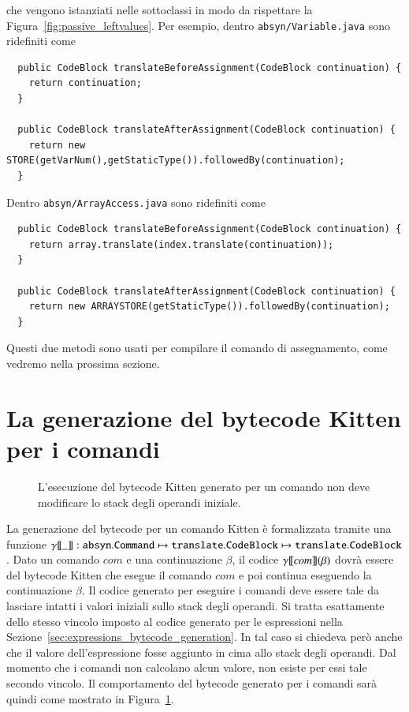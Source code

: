 %
\noindent
che vengono istanziati nelle sottoclassi in modo da rispettare la
Figura~\ref{fig:passive_leftvalues}. Per esempio, dentro
\texttt{absyn/Variable.java} sono ridefiniti come
%
\begin{verbatim}
  public CodeBlock translateBeforeAssignment(CodeBlock continuation) {
    return continuation;
  }

  public CodeBlock translateAfterAssignment(CodeBlock continuation) {
    return new STORE(getVarNum(),getStaticType()).followedBy(continuation);
  }
\end{verbatim}
%
Dentro \texttt{absyn/ArrayAccess.java} sono ridefiniti come
%
\begin{verbatim}
  public CodeBlock translateBeforeAssignment(CodeBlock continuation) {
    return array.translate(index.translate(continuation));
  }

  public CodeBlock translateAfterAssignment(CodeBlock continuation) {
    return new ARRAYSTORE(getStaticType()).followedBy(continuation);
  }
\end{verbatim}
%
Questi due metodi sono usati per compilare il comando di
assegnamento, come vedremo nella prossima sezione.
%
\section{La generazione del bytecode Kitten per i comandi}
  \label{sec:commands_bytecode_generation}
%
\begin{figure}[t]
\begin{center}
\end{center}
\caption{L'esecuzione del bytecode Kitten generato per un comando non deve modificare lo stack degli operandi iniziale.}
  \label{fig:russian2}
\end{figure}
%
La generazione del bytecode per un comando Kitten \`e
formalizzata tramite una funzione ${\gamma[\![{\_}]\!]}:\mathtt{absyn.Command}\mapsto
\mathtt{translate.CodeBlock}\mapsto\mathtt{translate.CodeBlock}$.
Dato un comando $\mathit{com}$
e una continuazione $\beta$, il codice ${\gamma[\![{\mathit{com}}]\!]}(\beta)$
dovr\`a essere del bytecode Kitten che esegue il comando
$\mathit{com}$ e poi continua eseguendo la continuazione $\beta$.
Il codice generato per eseguire i comandi deve essere tale da
lasciare intatti i valori iniziali sullo stack degli operandi.
Si tratta esattamente dello stesso vincolo imposto al codice generato per
le espressioni nella Sezione~\ref{sec:expressions_bytecode_generation}.
In tal caso si chiedeva per\`o anche
che il valore dell'espressione fosse aggiunto
in cima allo stack degli operandi. Dal momento che i comandi non calcolano
alcun valore, non esiste per essi tale secondo vincolo. Il comportamento
del bytecode generato per i comandi sar\`a quindi come mostrato in
Figura~\ref{fig:russian2}.

